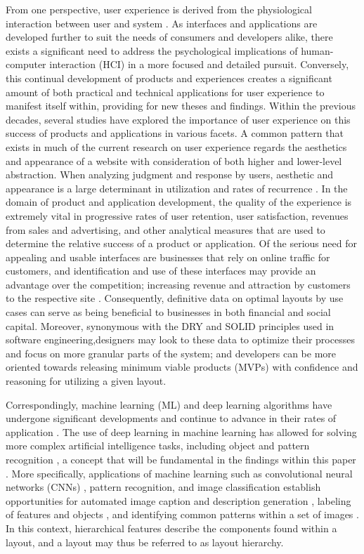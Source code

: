 From one perspective, user experience is derived from the physiological interaction between user and system \cite{10.1145/2688203}. As interfaces and applications are developed further to suit the needs of consumers and developers alike, there exists a significant need to address the psychological implications of human-computer interaction (HCI) in a more focused and detailed pursuit. Conversely, this continual development of products and experiences creates a significant amount of both practical and technical applications for user experience to manifest itself within, providing for new theses and findings. Within the previous decades, several studies have explored the importance of user experience on this success of products and applications \cite{doi:10.1080/07370024.2011.646927, mousetracking, parallax} in various facets. A common pattern that exists in much of the current research on user experience regards the aesthetics and appearance of a website with consideration of both higher and lower-level abstraction. When analyzing judgment and response by users, aesthetic and appearance is a large determinant in utilization and rates of recurrence \cite{10.1145/3206025.3206039}. In the domain of product and application development, the quality of the experience is extremely vital in progressive rates of user retention, user satisfaction, revenues from sales and advertising, and other analytical measures that are used to determine the relative success of a product or application. Of the serious need for appealing and usable interfaces are businesses that rely on online traffic for customers, and identification and use of these interfaces may provide an advantage over the competition; increasing revenue and attraction by customers to the respective site \cite{10.1145/3206025.3206039}. Consequently, definitive data on optimal layouts by use cases can serve as being beneficial to businesses in both financial and social capital. Moreover, synonymous with the DRY and SOLID principles used in software engineering,designers may look to these data to optimize their processes and focus on more granular parts of the system; and developers can be more oriented towards releasing minimum viable products (MVPs) with confidence and reasoning for utilizing a given layout.

Correspondingly, machine learning (ML) and deep learning algorithms have undergone significant developments and continue to advance in their rates of application \cite{Wang2017OnTO}. The use of deep learning in machine learning has allowed for solving more complex artificial intelligence tasks, including object and pattern recognition \cite{7780459}, a concept that will be fundamental in the findings within this paper \cite{Wang2017OnTO}. More specifically, applications of machine learning such as convolutional neural networks (CNNs) \cite{Sermanet2013OverFeatIR}, pattern recognition, and image classification establish opportunities for automated image caption and description generation \cite{7298935}, labeling of features and objects \cite{hierarchical}, and identifying common patterns within a set of images \cite{doi:10.1080/10447318.2018.1554319}. In this context, hierarchical features describe the components found within a layout, and a layout may thus be referred to as layout hierarchy.

